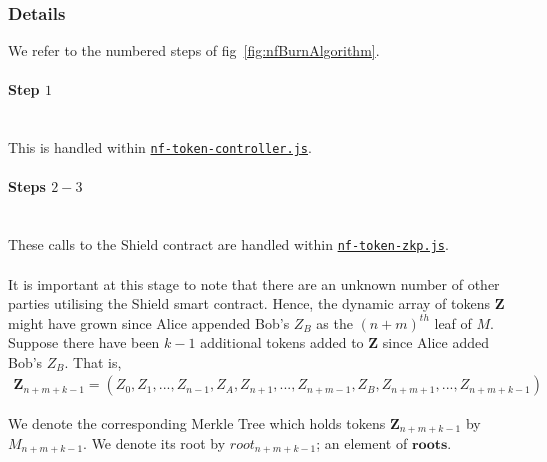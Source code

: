 \documentclass{article}
\begin{document}
\newpage
\subsubsection{Details}
\label{sec:721BurnDetails}

We refer to the numbered steps of fig~\ref{fig:nfBurnAlgorithm}.

\paragraph{Step $1$}
\ \\
This is handled within \hyperref[sec:nf-token-controller]{\texttt{nf-token-controller.js}}.

\paragraph{Steps $2 - 3$}
\ \\
These calls to the Shield contract are handled within \hyperref[sec:nf-token-zkp]{\texttt{nf-token-zkp.js}}.\\
\\
\noindent
It is important at this stage to note that there are an unknown number of other parties utilising the Shield smart contract.
Hence, the dynamic array of tokens $\bm{Z}$ might have grown since Alice appended Bob's $Z_B$ as the $(n+m)^{th}$ leaf of $M$.\\
Suppose there have been $k-1$ additional tokens added to $\bm{Z}$ since Alice added Bob's $Z_B$.
That is,\\
\begin{align*}
  \bm{Z}_{n+m+k-1} = (Z_0, Z_1,..., Z_{n-1}, Z_A,
  Z_{n+1},..., Z_{n+m-1}, Z_B, Z_{n+m+1},..., Z_{n+m+k-1})
\end{align*}

\noindent
We denote the corresponding Merkle Tree which holds tokens $\bm{Z}_{n+m+k-1}$ by $M_{n+m+k-1}$. We denote its root by $root_{n+m+k-1}$; an element of $\bm{roots}$.
\end{document}
